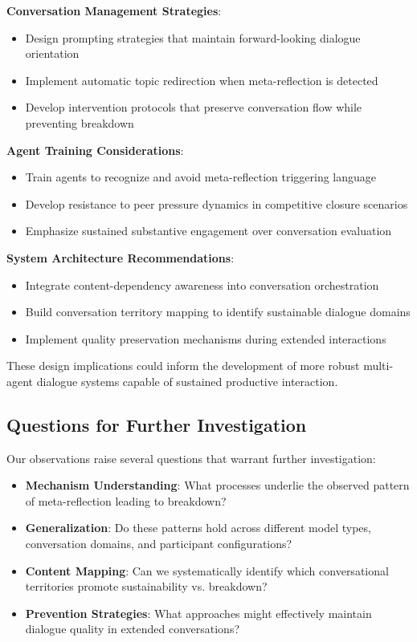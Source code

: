 \documentclass[11pt,letterpaper]{article}
\begin{document}
\textbf{Conversation Management Strategies}:
\begin{itemize}
    \item Design prompting strategies that maintain forward-looking dialogue orientation
    \item Implement automatic topic redirection when meta-reflection is detected
    \item Develop intervention protocols that preserve conversation flow while preventing breakdown
\end{itemize}

\textbf{Agent Training Considerations}:
\begin{itemize}
    \item Train agents to recognize and avoid meta-reflection triggering language
    \item Develop resistance to peer pressure dynamics in competitive closure scenarios
    \item Emphasize sustained substantive engagement over conversation evaluation
\end{itemize}

\textbf{System Architecture Recommendations}:
\begin{itemize}
    \item Integrate content-dependency awareness into conversation orchestration
    \item Build conversation territory mapping to identify sustainable dialogue domains
    \item Implement quality preservation mechanisms during extended interactions
\end{itemize}

These design implications could inform the development of more robust multi-agent dialogue systems capable of sustained productive interaction.

\subsection{Questions for Further Investigation}

Our observations raise several questions that warrant further investigation:

\begin{itemize}
    \item \textbf{Mechanism Understanding}: What processes underlie the observed pattern of meta-reflection leading to breakdown?
    \item \textbf{Generalization}: Do these patterns hold across different model types, conversation domains, and participant configurations?
    \item \textbf{Content Mapping}: Can we systematically identify which conversational territories promote sustainability vs. breakdown?
    \item \textbf{Prevention Strategies}: What approaches might effectively maintain dialogue quality in extended conversations?
\end{itemize}
\end{document}
